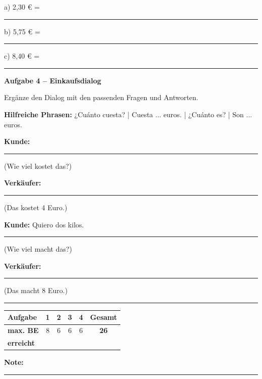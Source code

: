 \documentclass[11pt, a4paper]{article}
\newcommand{\fachfarbe}{spanisch}
\newcommand{\punktebox}[1]{\hfill\fbox{\small \_/#1}}
\newcommand{\luecke}[1]{\rule{#1}{0.4pt}}
\newenvironment{aufgabe}[1]{%
    \needspace{5\baselineskip}%
    \nopagebreak[4]%
    \vspace{10pt}
    \noindent\textbf{\textcolor{\fachfarbe}{Aufgabe #1}}
    \nopagebreak[4]%
    \vspace{5pt}
    \nopagebreak[4]%
    \begin{list}{}{\leftmargin=0pt}
    \item[]
}{%
    \end{list}
}
\begin{document}
\vspace{0.5em}

\noindent
a) 2,30 € = \luecke{8cm}

\vspace{1em}

\noindent
b) 5,75 € = \luecke{8cm}

\vspace{1em}

\noindent
c) 8,40 € = \luecke{8cm}

\vspace{15pt}


\begin{aufgabe}{4 -- Einkaufsdialog}
Ergänze den Dialog mit den passenden Fragen und Antworten. \punktebox{6}
\end{aufgabe}

\begin{hinweis}
\textbf{Hilfreiche Phrasen:} ¿Cuánto cuesta? | Cuesta ... euros. | ¿Cuánto es? | Son ... euros.
\end{hinweis}

\vspace{0.5em}

\noindent
\textbf{Kunde:} \luecke{6cm} \hfill (Wie viel kostet das?)

\vspace{0.8em}

\noindent
\textbf{Verkäufer:} \luecke{6cm} \hfill (Das kostet 4 Euro.)

\vspace{0.8em}

\noindent
\textbf{Kunde:} Quiero dos kilos. \luecke{4cm} \hfill (Wie viel macht das?)

\vspace{0.8em}

\noindent
\textbf{Verkäufer:} \luecke{6cm} \hfill (Das macht 8 Euro.)


\vspace{25pt}
\hrule
\vspace{10pt}

\noindent
\begin{tabularx}{\textwidth}{|X|c|c|c|c||c|}
\hline
\textbf{Aufgabe} & 1 & 2 & 3 & 4 & \textbf{Gesamt} \\
\hline
\textbf{max. BE} & 8 & 6 & 6 & 6 & \textbf{26} \\
\hline
\textbf{erreicht} & & & & & \\[0.8em]
\hline
\end{tabularx}

\vspace{10pt}

\begin{flushright}
\textbf{Note:} \luecke{2cm}
\end{flushright}
\end{document}
